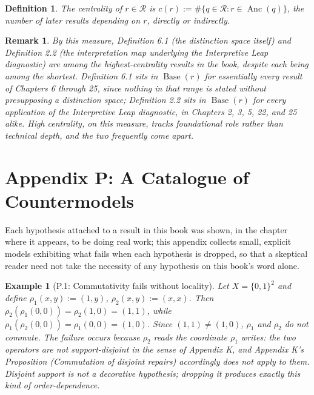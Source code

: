 \documentclass[11pt]{book}
\newtheorem*{appendixdefinition}{Definition}
\newtheorem*{appendixremark}{Remark}
\newtheorem*{appendixexample}{Example}
\begin{document}
\begin{appendixdefinition}
The \emph{centrality} of $r \in \mathcal R$ is $c(r) := \#\{q \in \mathcal R : r \in \operatorname{Anc}(q)\}$, the number of later results depending on $r$, directly or indirectly.
\end{appendixdefinition}

\begin{appendixremark}
By this measure, Definition 6.1 (the distinction space itself) and Definition 2.2 (the interpretation map underlying the Interpretive Leap diagnostic) are among the highest-centrality results in the book, despite each being among the shortest. Definition 6.1 sits in $\operatorname{Base}(r)$ for essentially every result of Chapters 6 through 25, since nothing in that range is stated without presupposing a distinction space; Definition 2.2 sits in $\operatorname{Base}(r)$ for every application of the Interpretive Leap diagnostic, in Chapters 2, 3, 5, 22, and 25 alike. High centrality, on this measure, tracks foundational role rather than technical depth, and the two frequently come apart.
\end{appendixremark}


\chapter*{Appendix P: A Catalogue of Countermodels}

Each hypothesis attached to a result in this book was shown, in the chapter where it appears, to be doing real work; this appendix collects small, explicit models exhibiting what fails when each hypothesis is dropped, so that a skeptical reader need not take the necessity of any hypothesis on this book's word alone.

\begin{appendixexample}[P.1: Commutativity fails without locality]
Let $X = \{0,1\}^2$ and define $\rho_1(x,y) := (1,y)$, $\rho_2(x,y) := (x,x)$. Then $\rho_2(\rho_1(0,0)) = \rho_2(1,0) = (1,1)$, while $\rho_1(\rho_2(0,0)) = \rho_1(0,0) = (1,0)$. Since $(1,1) \neq (1,0)$, $\rho_1$ and $\rho_2$ do not commute. The failure occurs because $\rho_2$ reads the coordinate $\rho_1$ writes: the two operators are not support-disjoint in the sense of Appendix K, and Appendix K's Proposition (Commutation of disjoint repairs) accordingly does not apply to them. Disjoint support is not a decorative hypothesis; dropping it produces exactly this kind of order-dependence.
\end{appendixexample}
\end{document}
